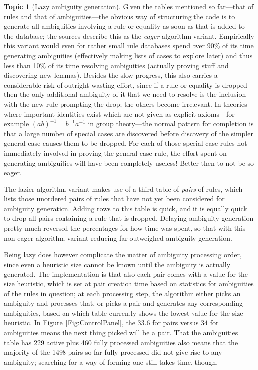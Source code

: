 \documentclass{article}
\theoremstyle{definition}
\newtheorem{topic}{Topic}
\begin{document}
\begin{topic}[Lazy ambiguity generation] \label{Topic:Lazier}
  Given the tables mentioned so far---that of rules and that of 
  ambiguities---the obvious way of structuring the code is to 
  generate all ambiguities involving a rule or equality as soon as 
  that is added to the database; the sources describe this as the 
  \emph{eager} algorithm variant. Empirically this variant would 
  even for rather small rule databases spend over 90\% of its time 
  generating ambiguities (effectively making lists of cases to 
  explore later) and thus less than 10\% of its time resolving 
  ambiguities (actually proving stuff and discovering new lemmas). 
  Besides the slow progress, this also carries a considerable risk of 
  outright wasting effort, since if a rule or equality is dropped 
  then the only 
  additional ambiguity of it that we need to resolve is the inclusion 
  with the new rule prompting the drop; the others become irrelevant. 
  In theories where important identities exist which are not given as 
  explicit axioms---for example \((ab)^{-1} = b^{-1} a^{-1}\) in 
  group theory---the normal pattern for completion is that a large 
  number of special cases are discovered before discovery of the 
  simpler general case causes them to be dropped. For each of those 
  special case rules not immediately involved in proving the general 
  case rule, the effort spent on generating ambiguities will have 
  been completely useless! Better then to not be so eager.
  
  The \textsf{lazier} algorithm variant makes use of a third table of 
  \emph{pairs} of rules, which lists those unordered pairs of rules 
  that have not yet been considered for ambiguity generation. Adding 
  rows to this table is quick, and it is equally quick to drop all 
  pairs containing a rule that is dropped. Delaying ambiguity 
  generation pretty much reversed the percentages for how time was 
  spent, so that with this non-eager algorithm variant reducing far 
  outweighed ambiguity generation.
  
  Being lazy does however complicate the matter of ambiguity 
  processing order, since even a heuristic size cannot be known until 
  the ambiguity is actually generated. The implementation is that 
  also each pair comes with a value for the size heuristic, which is 
  set at pair creation time based on statistics for ambiguities of 
  the rules in question; at each processing step, the algorithm 
  either picks an ambiguity and processes that, or picks a pair and 
  generates any corresponding ambiguities, based on which table 
  currently shows the lowest value for the size heuristic. In 
  Figure~\ref{Fig:ControlPanel}, the $33.6$ for pairs versus $34$ for 
  ambiguities means the next thing picked will be a pair. That the 
  ambiguities table has 229 active plus 460 fully processed 
  ambiguities also means that the majority of the 1498 pairs so far 
  fully processed did not give rise to any ambiguity; searching for a 
  way of forming one still takes time, though.
\end{topic}
\end{document}
